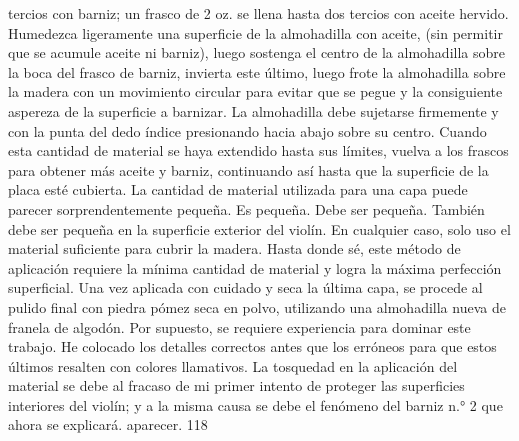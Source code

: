 tercios con barniz; un frasco de 2 oz. se llena hasta dos tercios con aceite hervido. Humedezca ligeramente una superficie de la almohadilla con aceite, (sin permitir que se acumule aceite ni barniz), luego sostenga el centro de la almohadilla sobre la boca del frasco de barniz, invierta este último, luego frote la almohadilla sobre la madera con un movimiento circular para evitar que se pegue y la consiguiente aspereza de la superficie a barnizar. La almohadilla debe sujetarse firmemente y con la punta del dedo índice presionando hacia abajo sobre su centro. Cuando esta cantidad de material se haya extendido hasta sus límites, vuelva a los frascos para obtener más aceite y barniz, continuando así hasta que la superficie de la placa esté cubierta. La cantidad de material utilizada para una capa puede parecer sorprendentemente pequeña. Es pequeña. Debe ser pequeña. También debe ser pequeña en la superficie exterior del violín. En cualquier caso, solo uso el material suficiente para cubrir la madera.
Hasta donde sé, este método de aplicación requiere la mínima cantidad de material y logra la máxima perfección superficial. Una vez aplicada con cuidado y seca la última capa, se procede al pulido final con piedra pómez seca en polvo, utilizando una almohadilla nueva de franela de algodón. Por supuesto, se requiere experiencia para dominar este trabajo.
He colocado los detalles correctos antes que los erróneos para que estos últimos resalten con colores llamativos. La tosquedad en la aplicación del material se debe al fracaso de mi primer intento de proteger las superficies interiores del violín; y a la misma causa se debe el fenómeno del barniz n.° 2 que ahora se explicará.
aparecer. 118

